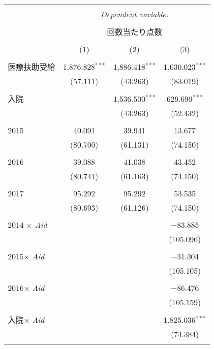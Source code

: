 \documentclass{jsarticle}
\begin{document}
\begin{table}[!htbp] \centering 
  \caption{} 
  \label{} 
  \small
\begin{tabular}{@{\extracolsep{5pt}}lccc} 
\\[-1.8ex]\hline 
\hline \\[-1.8ex] 
 & \multicolumn{3}{c}{\textit{Dependent variable:}} \\ 
\cline{2-4} 
\\[-1.8ex] & \multicolumn{3}{c}{回数当たり点数} \\ 
\\[-1.8ex] & (1) & (2) & (3)\\ 
\hline \\[-1.8ex] 
  医療扶助受給 & 1,876.828$^{***}$ & 1,886.418$^{***}$ & 1,030.023$^{***}$ \\ 
  & (57.111) & (43.263) & (83.019) \\ 
  & & & \\ 
 入院 &  & 1,536.500$^{***}$ & 629.690$^{***}$ \\ 
  &  & (43.263) & (52.432) \\ 
  & & & \\ 
 2015 & 40.091 & 39.941 & 13.677 \\ 
  & (80.700) & (61.131) & (74.150) \\ 
  & & & \\ 
 2016 & 39.088 & 41.038 & 43.452 \\ 
  & (80.741) & (61.163) & (74.150) \\ 
  & & & \\ 
 2017 & 95.292 & 95.292 & 53.535 \\ 
  & (80.693) & (61.126) & (74.150) \\ 
  & & & \\ 
 2014 $\times$ \textit{Aid} &  &  & $-$83.885 \\ 
  &  &  & (105.096) \\ 
  & & & \\ 
 2015$\times$ \textit{Aid} &  &  & $-$31.304 \\ 
  &  &  & (105.105) \\ 
  & & & \\ 
 2016$\times$ \textit{Aid} &  &  & $-$86.476 \\ 
  &  &  & (105.159) \\ 
  & & & \\ 
 入院$\times$ \textit{Aid} &  &  & 1,825.036$^{***}$ \\ 
  &  &  & (74.384) \\ 
  & & & \\ 

\end{tabular}
\end{table}
\end{document}
